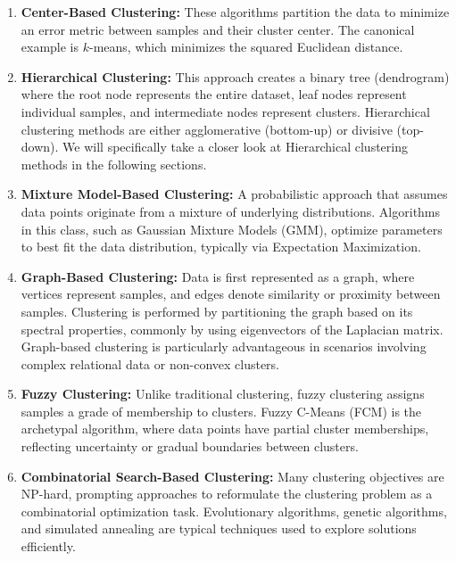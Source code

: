 \begin{enumerate}

  \item \textbf{Center-Based Clustering:} These algorithms partition
    the data to minimize an error metric between samples and their
    cluster center. The canonical example is \(k\)-means, which
    minimizes the squared Euclidean distance.

  \item \textbf{Hierarchical Clustering:} This approach creates a
    binary tree (dendrogram) where the root node represents the
    entire dataset, leaf nodes represent individual samples, and
    intermediate nodes represent clusters. Hierarchical clustering
    methods are either agglomerative (bottom-up) or divisive
    (top-down). We will specifically take a closer look at
    Hierarchical clustering methods in the following sections.

  \item \textbf{Mixture Model-Based Clustering:} A probabilistic
    approach that assumes data points originate from a mixture of
    underlying distributions. Algorithms in this class, such as
    Gaussian Mixture Models (GMM), optimize parameters to best fit
    the data distribution, typically via Expectation Maximization.

  \item \textbf{Graph-Based Clustering:} Data is first represented as
    a graph, where vertices represent samples, and edges denote
    similarity or proximity between samples. Clustering is performed
    by partitioning the graph based on its spectral properties,
    commonly by using eigenvectors of the Laplacian matrix.
    Graph-based clustering is particularly advantageous in scenarios
    involving complex relational data or non-convex clusters.

  \item \textbf{Fuzzy Clustering:} Unlike traditional clustering,
    fuzzy clustering assigns samples a grade of membership to
    clusters. Fuzzy C-Means (FCM) is the archetypal algorithm, where
    data points have partial cluster memberships, reflecting
    uncertainty or gradual boundaries between clusters.

  \item \textbf{Combinatorial Search-Based Clustering:} Many
    clustering objectives are NP-hard, prompting approaches to
    reformulate the clustering problem as a combinatorial
    optimization task. Evolutionary algorithms, genetic algorithms,
    and simulated annealing are typical techniques used to explore
    solutions efficiently.

\end{enumerate}

